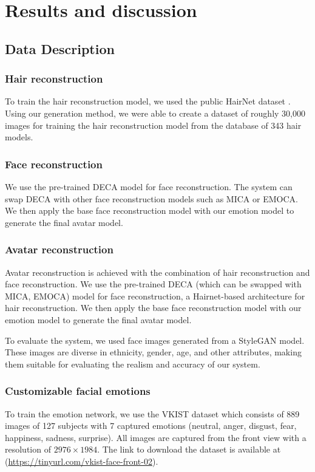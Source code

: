 \section{Results and discussion}
\label{sec:results}

\subsection{Data Description}
\subsubsection{Hair reconstruction}
To train the hair reconstruction model, we used the public HairNet dataset \cite{zhouHairNetSingleViewHair2018}. Using our generation method, we were able to create a dataset of roughly 30,000 images for training the hair reconstruction model from the database of 343 hair models.

\subsubsection{Face reconstruction}
We use the pre-trained DECA model for face reconstruction. The system can swap DECA with other face reconstruction models such as MICA \cite{zielonkaMetricalReconstructionHuman2022} or EMOCA. We then apply the base face reconstruction model with our emotion model to generate the final avatar model.

\subsubsection{Avatar reconstruction}
Avatar reconstruction is achieved with the combination of hair reconstruction and face reconstruction. We use the pre-trained DECA (which can be swapped with MICA, EMOCA) model for face reconstruction, a Hairnet-based architecture for hair reconstruction. We then apply the base face reconstruction model with our emotion model to generate the final avatar model.

To evaluate the system, we used face images generated from a StyleGAN \cite{karrasStyleBasedGeneratorArchitecture2019} model. These images are diverse in ethnicity, gender, age, and other attributes, making them suitable for evaluating the realism and accuracy of our system.

\subsubsection{Customizable facial emotions}
To train the emotion network, we use the VKIST dataset which consists of 889 images of 127 subjects with 7 captured emotions (neutral, anger, disgust, fear, happiness, sadness, surprise). All images are captured from the front view with a resolution of $2976\times1984$. The link to download the dataset is available at (\url{https://tinyurl.com/vkist-face-front-02}).

